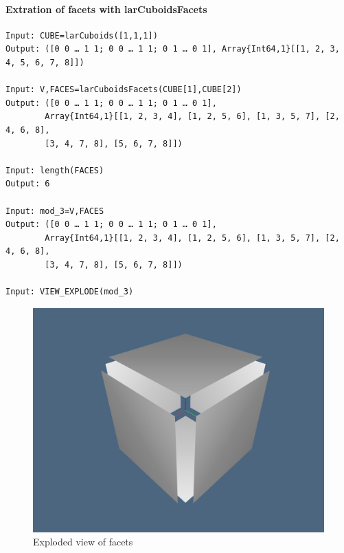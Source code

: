 \documentclass{article}
\begin{document}
\paragraph{Extration of facets with larCuboidsFacets}
\begin{flushleft} \small
\begin{list}{}{} \item
   \begin{Verbatim}[tabsize=4]
Input: CUBE=larCuboids([1,1,1])
Output: ([0 0 … 1 1; 0 0 … 1 1; 0 1 … 0 1], Array{Int64,1}[[1, 2, 3, 4, 5, 6, 7, 8]])

Input: V,FACES=larCuboidsFacets(CUBE[1],CUBE[2])
Output: ([0 0 … 1 1; 0 0 … 1 1; 0 1 … 0 1],
        Array{Int64,1}[[1, 2, 3, 4], [1, 2, 5, 6], [1, 3, 5, 7], [2, 4, 6, 8],
        [3, 4, 7, 8], [5, 6, 7, 8]])

Input: length(FACES)
Output: 6

Input: mod_3=V,FACES
Output: ([0 0 … 1 1; 0 0 … 1 1; 0 1 … 0 1],
        Array{Int64,1}[[1, 2, 3, 4], [1, 2, 5, 6], [1, 3, 5, 7], [2, 4, 6, 8],
        [3, 4, 7, 8], [5, 6, 7, 8]])

Input: VIEW_EXPLODE(mod_3)
   \end{Verbatim}
\end{list}
\end{flushleft}

\begin{figure}[h!]
\centering
\includegraphics[scale=0.6]{estrazioneFacce.jpg}
\caption{Exploded view of facets}
\end{figure}
\end{document}
